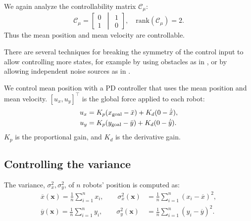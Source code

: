 We again analyze the controllability matrix $\mathcal{C}_{\mu}$:
\begin{equation}
\mathcal{C}_\mu=\left[ \begin{matrix} 
0\\
1
\end{matrix}
\,\middle\vert\,
 \begin{matrix} 
1\\
0
\end{matrix}
 \right],  \quad \textrm{rank}(\mathcal{C}_\mu)=2.
\end{equation}
Thus the mean position and mean velocity are controllable.


There are several techniques for breaking the symmetry of the control input to allow controlling more states, for example by using obstacles as in \cite{Becker2013b}, or by allowing independent noise sources as in \cite{beckerIJRR2014}.

We control mean position with a PD controller that uses the mean position and mean velocity. $[u_x,u_y]^\top$ is the global force applied to each robot:
\begin{align}
u_x &= K_{p}(x_{\rm{goal}} - \bar{x}) + K_{d}(0-\dot{\bar{x}}), \nonumber\\
u_y &= K_{p}(y_{\rm{goal}}  - \bar{y}) + K_{d}(0-\dot{\bar{y}}).  \label{eq:PDcontrolPosition}
\end{align}
 $K_{p}$ is the proportional gain, and $K_{d}$ is the derivative gain. 


\subsection{Controlling the variance}\label{sec:VarianceControl}

The variance, $\sigma_x^2,\sigma_y^2$, of $n$ robots' position is computed as:
\begin{align}\label{eq:meanVar}
 \overline{x}(\mathbf{x}) = \frac{1}{n} \sum_{i=1}^n x_{i}, \qquad  %
\sigma_x^2(\mathbf{x}) &= \frac{1}{n} \sum_{i=1}^n (x_{i} - \overline{x})^2,  \nonumber \\ 
 \overline{y}(\mathbf{x}) = \frac{1}{n} \sum_{i=1}^n y_{i}, \qquad  %
\sigma_y^2(\mathbf{x}) &= \frac{1}{n} \sum_{i=1}^n (y_{i} - \overline{y})^2.  
\end{align}

